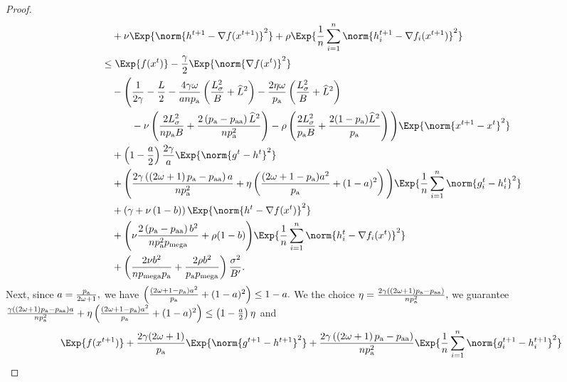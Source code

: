 \documentclass{article}
\newcommand*{\probavailable}{\ensuremath{p_{\textnormal{a}}}}
\newcommand*{\probpairaa}{\ensuremath{p_{\textnormal{aa}}}}
\newcommand*{\probmega}{\ensuremath{p_{\text{mega}}}}
\begin{document}
\begin{proof}
\begin{align*}
    &\quad  + \nu \Exp{\norm{h^{t+1} - \nabla f(x^{t+1})}^2} + \rho \Exp{\frac{1}{n}\sum_{i=1}^n\norm{h^{t+1}_i - \nabla f_i(x^{t+1})}^2}\\
    &\leq \Exp{f(x^t)} - \frac{\gamma}{2}\Exp{\norm{\nabla f(x^t)}^2} \\
    &\quad - \Bigg(\frac{1}{2\gamma} - \frac{L}{2} - \frac{4 \gamma \omega}{a n \probavailable}\left(\frac{L_{\sigma}^2}{B} + \widehat{L}^2\right) - \frac{2\eta \omega}{\probavailable} \left(\frac{L_{\sigma}^2}{B} + \widehat{L}^2\right) \\
    &\qquad\quad - \nu \left(\frac{2 L_{\sigma}^2}{n \probavailable B} + \frac{2\left(\probavailable - \probpairaa\right) \widehat{L}^2}{n \probavailable^2}\right) - \rho \left(\frac{2 L_{\sigma}^2}{\probavailable B} + \frac{2(1 - \probavailable) \widehat{L}^2}{\probavailable}\right)\Bigg) \Exp{\norm{x^{t+1} - x^t}^2} \\
    &\quad + \left(1 - \frac{a}{2}\right)\frac{2\gamma}{a} \Exp{\norm{g^{t} - h^{t}}^2} \\
    &\quad + \Bigg( \frac{2\gamma\left(\left(2 \omega + 1\right)\probavailable - \probpairaa\right)a}{n \probavailable^2} + \eta \left(\frac{(2\omega + 1 - \probavailable) a^2}{\probavailable} + (1 - a)^2\right)\Bigg)\Exp{\frac{1}{n}\sum_{i=1}^n\norm{g^{t}_i - h^{t}_i}^2} \\
    &\quad + \left(\gamma + \nu \left(1 - b\right)\right) \Exp{\norm{h^{t} - \nabla f(x^{t})}^2} \\
    &\quad + \Bigg(\nu \frac{2\left(\probavailable - \probpairaa\right) b^2}{n \probavailable^2 \probmega} + \rho (1 - b)\Bigg)\Exp{\frac{1}{n}\sum_{i=1}^n\norm{h^{t}_i - \nabla f_i(x^{t})}^2} \\
    &\quad + \left(\frac{2 \nu b^2}{n \probmega \probavailable} + \frac{2 \rho b^2}{\probavailable \probmega}\right) \frac{\sigma^2}{B'}.
  \end{align*}
  Next, since $a = \frac{\probavailable}{2\omega + 1},$ we have $\left(\frac{(2\omega + 1 - \probavailable) a^2}{\probavailable} + (1 - a)^2\right) \leq 1 - a.$ We the choice $\eta = \frac{2\gamma\left(\left(2 \omega + 1\right)\probavailable - \probpairaa\right)}{n \probavailable^2},$ we guarantee $\frac{\gamma\left(\left(2 \omega + 1\right)\probavailable - \probpairaa\right)a}{n \probavailable^2} + \eta \left(\frac{(2\omega + 1 - \probavailable) a^2}{\probavailable} + (1 - a)^2\right) \leq \left(1 - \frac{a}{2}\right)\eta$ and 
  \begin{align*}
    &\Exp{f(x^{t + 1})} + \frac{2\gamma(2\omega + 1)}{\probavailable} \Exp{\norm{g^{t+1} - h^{t+1}}^2} + \frac{2\gamma\left(\left(2 \omega + 1\right)\probavailable - \probpairaa\right)}{n \probavailable^2} \Exp{\frac{1}{n}\sum_{i=1}^n\norm{g^{t+1}_i - h^{t+1}_i}^2}\\

\end{align*}
\end{proof}
\end{document}
